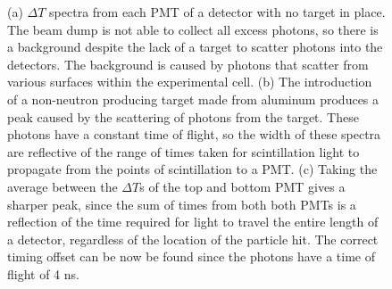 \begin{figure}[htbp]
\begin{center}
\end{center}

\caption{(a) $\Delta T$ spectra from each PMT of a detector with no target in place.
The beam dump is not able to collect all excess photons, so there is a background despite the lack of a target to scatter photons into the detectors.
The background is caused by photons that scatter from various surfaces within the experimental cell.
(b) The introduction of a non-neutron producing target made from aluminum produces a peak caused by the scattering of photons from the target.
These photons have a constant time of flight, so the width of these spectra are reflective of the range of times taken for scintillation light to propagate from the points of scintillation to a PMT.
(c) Taking the average between the $\Delta T$s of the top and bottom PMT gives a sharper peak, since the sum of times from both both PMTs is a reflection of the time required for light to travel the entire length of a detector, regardless of the location of the particle hit.
The correct timing offset can be now be found since the photons have a time of flight of 4 ns. }
\label{fig:ToFDetermination}
\end{figure}
   
